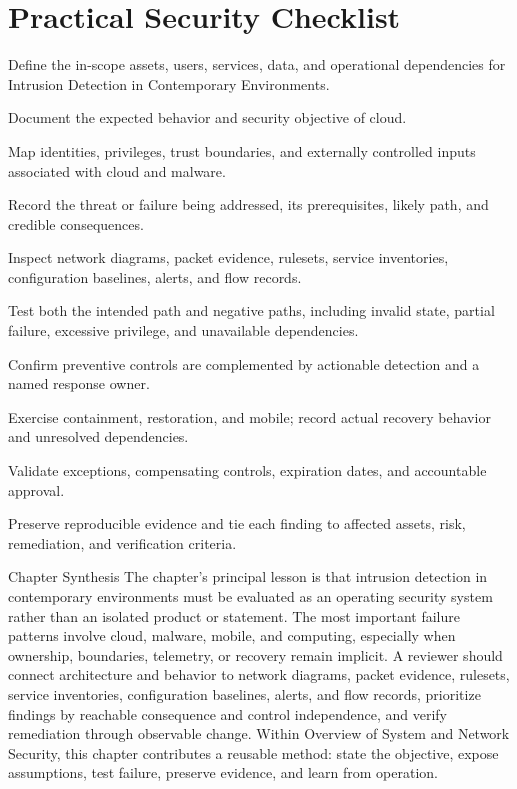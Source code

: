 \documentclass[11pt,letterpaper]{article}
\begin{document}
\section*{Practical Security Checklist}
\begin{CornellChecklist}
\item Define the in-scope assets, users, services, data, and operational dependencies for Intrusion Detection in Contemporary Environments.
\item Document the expected behavior and security objective of cloud.
\item Map identities, privileges, trust boundaries, and externally controlled inputs associated with cloud and malware.
\item Record the threat or failure being addressed, its prerequisites, likely path, and credible consequences.
\item Inspect network diagrams, packet evidence, rulesets, service inventories, configuration baselines, alerts, and flow records.
\item Test both the intended path and negative paths, including invalid state, partial failure, excessive privilege, and unavailable dependencies.
\item Confirm preventive controls are complemented by actionable detection and a named response owner.
\item Exercise containment, restoration, and mobile; record actual recovery behavior and unresolved dependencies.
\item Validate exceptions, compensating controls, expiration dates, and accountable approval.
\item Preserve reproducible evidence and tie each finding to affected assets, risk, remediation, and verification criteria.
\end{CornellChecklist}
\begin{CornellSummaryBox}{Chapter Synthesis}
The chapter's principal lesson is that intrusion detection in contemporary environments must be evaluated as an operating security system rather than an isolated product or statement. The most important failure patterns involve cloud, malware, mobile, and computing, especially when ownership, boundaries, telemetry, or recovery remain implicit. A reviewer should connect architecture and behavior to network diagrams, packet evidence, rulesets, service inventories, configuration baselines, alerts, and flow records, prioritize findings by reachable consequence and control independence, and verify remediation through observable change. Within Overview of System and Network Security, this chapter contributes a reusable method: state the objective, expose assumptions, test failure, preserve evidence, and learn from operation.
\end{CornellSummaryBox}
\end{document}
